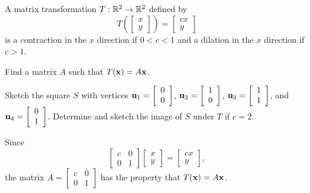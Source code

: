 \begin{example} A matrix transformation $T: \mathbb{R}^2 \to \mathbb{R}^2$ defined by 
\[T\left(\left[ \begin{array}{c} x\\y \end{array} \right] \right) = \left[ \begin{array}{c} cx\\y \end{array} \right]\]
is a contraction in the $x$ direction if $0 < c < 1$ and a dilation in the $x$ direction if $c>1$.
	\ba
	\item Find a matrix $A$ such that $T(\mathbf{x}) = A\mathbf{x}$. 
	
	\item Sketch the square $S$ with vertices $\mathbf{u}_1 =  \left[ \begin{array}{c} 0\\0 \end{array} \right]$, $\mathbf{u}_2 =  \left[ \begin{array}{c} 1\\0 \end{array} \right]$, $\mathbf{u}_3 =  \left[ \begin{array}{c} 1\\1 \end{array} \right]$, and $\mathbf{u}_4 =  \left[ \begin{array}{c} 0\\1 \end{array} \right]$. Determine and sketch the image of $S$ under $T$ if $c = 2$. 
	
	\ea
	
\ExampleSolution
\ba
\item Since 
\[\left[ \begin{array}{cc} c&0\\0&1 \end{array}\right] \left[ \begin{array}{c} x\\y \end{array} \right] = 
\left[ \begin{array}{c} cx\\y \end{array} \right],\]
the matrix $A = \left[ \begin{array}{cc} c&0\\0&1 \end{array}\right]$ has the property that $T(\mathbf{x}) = A\mathbf{x}$. 


\end{example}
